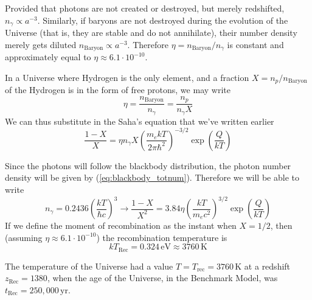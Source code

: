 \begin{tcolorbox}[enhanced,attach boxed title to top center={yshift=-3mm,yshifttext=-1mm},
  colback=blue!5!white,colframe=blue!75!black,colbacktitle=blue!80!black,
  title=Baryon to Photon Ratio,
  boxed title style={size=small,colframe=blue!50!black}]
  Provided that photons are not created or destroyed, but merely redshifted, $n_{\gamma} \propto a^{-3}$. Similarly, if baryons are not destroyed during the evolution of the Universe (that is, they are stable and do not annihilate), their number density merely gets diluted $n_{\text{Baryon}} \propto a^{-3}$. Therefore $\eta = n_{\text{Baryon}}/n_{\gamma}$ is constant and approximately equal to $\eta \approx 6.1 \cdot 10^{-10}$.
\end{tcolorbox}
\par In a Universe where Hydrogen is the only element, and a fraction $X = n_{p}/n_{\text{Baryon}}$ of the Hydrogen is in the form of free protons, we may write
\begin{equation}
    \eta = \frac{n_{\text{Baryon}}}{n_{\gamma}} = \frac{n_{p}}{n_{\gamma}X}
    \label{eq:pbr}
\end{equation}
We can thus substitute in the Saha's equation that we've written earlier
\begin{equation*}
    \frac{1-X}{X} = \eta n_{\gamma}X\left(\frac{m_{e}kT}{2\pi\hbar^{2}}\right)^{-3/2}\exp\left(\frac{Q}{kT}\right)
\end{equation*}
\par Since the photons will follow the blackbody distribution, the photon number density will be given by (\ref{eq:blackbody_totnum}). Therefore we will be able to write
\begin{equation}
    n_{\gamma} = 0.2436\left(\frac{kT}{\hbar c}\right)^{3} \to \frac{1-X}{X^{2}} = 3.84\eta \left(\frac{kT}{m_{e}c^{2}}\right)^{3/2}\exp\left(\frac{Q}{kT}\right)
    \label{eq:ionization_temp}
\end{equation}
If we define the moment of recombination as the instant when $X = 1/2$, then (assuming $\eta \approx 6.1 \cdot 10^{-10}$) the recombination temperature is
\begin{equation}
    kT_{\text{Rec}} = 0.324\,\text{eV} \approx 3760\,\text{K}
    \label{eq:recombinationtemperature}
\end{equation}
\par The temperature of the Universe had a value $T = T_{\text{rec}} = 3760\,\text{K}$ at a redshift $z_{\text{Rec}} = 1380$, when the age of the Universe, in the Benchmark Model, was $t_{\text{Rec}} = 250,000\,\text{yr}$.
